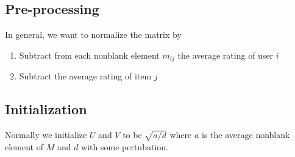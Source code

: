 \subsection{Pre-processing}
In general, we want to normalize the matrix by 
    \begin{enumerate}
        \item Subtract from each nonblank element $m_{ij}$ the average rating of user $i$ 
        \item Subtract the average rating of item $j$
    \end{enumerate}

\subsection{Initialization} 
Normally we initialize $U$ and $V$ to be $\sqrt{a/d}$ where $a$ is the average nonblank element of $M$ and $d$ with some pertubation. 